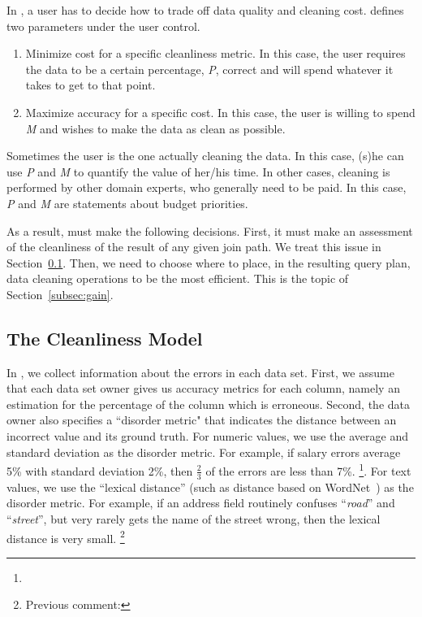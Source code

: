 In \dcv, a user has to decide how to trade off data quality and cleaning cost. 
\dcv defines two parameters under the user control.

\begin{enumerate}
\item Minimize cost for a specific cleanliness metric. In this case, the user requires the data to be a certain percentage, \emph{P}, correct and will spend whatever it takes to get to that point.

\item Maximize accuracy for a specific cost. In this case, the user is willing to spend \emph{M} and wishes to make the data as clean as possible.
\end{enumerate}

Sometimes the user is the one actually cleaning the data. In this case, (s)he can use \emph{P} and \emph{M} to quantify the value of her/his time. 
In other cases, cleaning is performed by other domain experts, who generally need to be paid. In this case, \emph{P} and \emph{M} are statements about budget priorities.


As a result, \dcv must make the following decisions.  First, it must make an assessment of the cleanliness of the result of any given join path.  We treat this issue in Section~\ref{subsec:model}. Then, we need to choose where to place, in the resulting query plan, data cleaning operations to be the most efficient. This is the topic of Section~\ref{subsec:gain}.


\subsection{The Cleanliness Model}
\label{subsec:model}

In \dcv, we collect information about the errors in each data set. First, we assume that each data set owner gives us accuracy metrics for each column, namely an estimation for the percentage of the column which is erroneous. Second, the data owner also specifies a ``disorder metric" that indicates the distance between an incorrect value and its ground truth. For numeric values, we use the average and standard deviation as the disorder metric. For example, if salary errors average 5\% with standard deviation 2\%, then $\frac{2}{3}$ of the errors are less than 7\%. \footnote{}. For text values, we use the ``lexical distance'' (such as distance based on WordNet~\cite{WordNet,DBLP:journals/cacm/Miller95}) as the disorder metric. For example, if an address field routinely confuses ``\textit{road}'' and ``\textit{street}'', but very rarely gets the name of the street wrong, then the lexical distance is very small. \footnote{Previous comment: }


